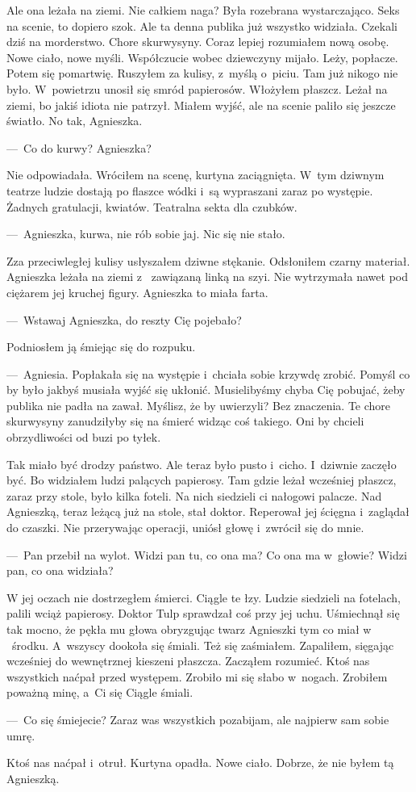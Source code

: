 Ale ona leżała na ziemi. Nie całkiem naga? Była rozebrana wystarczająco. Seks na scenie, to dopiero szok. Ale ta 
denna publika już wszystko widziała. Czekali dziś na morderstwo. Chore skurwysyny. Coraz lepiej rozumiałem nową 
osobę. Nowe ciało, nowe myśli. Współczucie wobec dziewczyny mijało. Leży, popłacze. Potem się pomartwię. Ruszyłem za 
kulisy, z~myślą o~piciu. Tam  już nikogo nie było. W~powietrzu unosił się smród papierosów. Włożyłem płaszcz. Leżał 
na ziemi, bo jakiś idiota nie patrzył. Miałem wyjść, ale na scenie paliło się jeszcze światło. No tak, Agnieszka.

---~Co do kurwy? Agnieszka? 

Nie odpowiadała. Wróciłem na scenę, kurtyna zaciągnięta. W~tym dziwnym teatrze ludzie dostają po flaszce wódki i~są 
wypraszani zaraz po występie. Żadnych gratulacji, kwiatów. Teatralna sekta dla czubków. 

---~Agnieszka, kurwa, nie rób sobie jaj. Nic się nie stało.

Zza przeciwległej kulisy usłyszałem dziwne stękanie. Odsłoniłem czarny materiał. Agnieszka leżała na ziemi z~
zawiązaną linką na szyi. Nie wytrzymała nawet pod ciężarem jej kruchej figury. Agnieszka to miała farta.

---~Wstawaj Agnieszka, do reszty Cię pojebało? 

Podniosłem ją śmiejąc się do rozpuku.

---~Agniesia. Popłakała się na występie i~chciała sobie krzywdę zrobić. Pomyśl co by było jakbyś musiała wyjść się 
ukłonić. Musielibyśmy chyba Cię pobujać, żeby publika nie padła na zawał. Myślisz, że by uwierzyli? Bez znaczenia. Te 
chore skurwysyny zanudziłyby się na śmierć widząc coś takiego. Oni by chcieli obrzydliwości od buzi po tyłek.

Tak miało być drodzy państwo. Ale teraz było pusto i~cicho. I~dziwnie zaczęło być. Bo widziałem ludzi palących 
papierosy. Tam gdzie leżał wcześniej płaszcz, zaraz przy stole, było kilka foteli. Na nich siedzieli ci nałogowi 
palacze. Nad Agnieszką, teraz leżącą już na stole, stał doktor. Reperował jej ścięgna i~zaglądał do czaszki. Nie 
przerywając operacji, uniósł głowę i~zwrócił się do mnie.

---~Pan przebił na wylot. Widzi pan tu, co ona ma? Co ona ma w~głowie? Widzi pan, co ona widziała? 

W jej oczach nie dostrzegłem śmierci. Ciągle te łzy. Ludzie siedzieli na fotelach, palili wciąż papierosy. Doktor 
Tulp sprawdzał coś przy jej uchu. Uśmiechnął się tak mocno, że pękła mu głowa obryzgując twarz Agnieszki tym co miał w
~środku. A~wszyscy dookoła się śmiali. Też się zaśmiałem. Zapaliłem, sięgając wcześniej do wewnętrznej kieszeni 
płaszcza. Zacząłem rozumieć. Ktoś nas wszystkich naćpał przed występem. Zrobiło mi się słabo w~nogach. Zrobiłem 
poważną minę, a~Ci się Ciągle śmiali.

---~Co się śmiejecie? Zaraz was wszystkich pozabijam, ale najpierw sam sobie umrę.

Ktoś nas naćpał i~otruł. Kurtyna opadła. Nowe ciało. Dobrze, że nie byłem tą Agnieszką.
